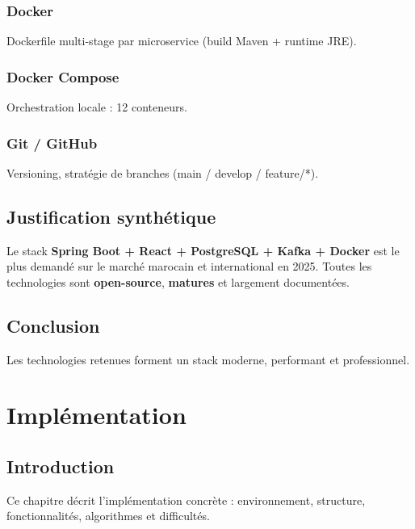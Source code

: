 \documentclass[12pt,a4paper,oneside]{report}
\begin{document}
\subsection{Docker}
Dockerfile multi-stage par microservice (build Maven + runtime JRE).

\subsection{Docker Compose}
Orchestration locale : 12 conteneurs.

\subsection{Git / GitHub}
Versioning, stratégie de branches (main / develop / feature/*).

\section{Justification synthétique}
Le stack \textbf{Spring Boot + React + PostgreSQL + Kafka + Docker} est le plus demandé sur le marché marocain et international en 2025. Toutes les technologies sont \textbf{open-source}, \textbf{matures} et largement documentées.

\section{Conclusion}
Les technologies retenues forment un stack moderne, performant et professionnel.

\chapter{Implémentation}

\section{Introduction}
Ce chapitre décrit l'implémentation concrète : environnement, structure, fonctionnalités, algorithmes et difficultés.
\end{document}
